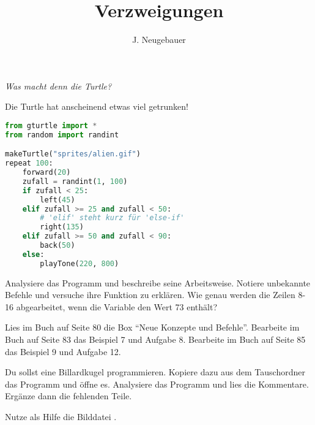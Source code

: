 \documentclass[10pt, a4paper]{scrartcl}
\author{J. Neugebauer}
\title{Verzweigungen}
\date{\Heute}
\begin{document}
\ReiheTitel

\begin{aufgabe}
	\emph{Was macht denn die Turtle?}
	
	Die Turtle hat anscheinend etwas viel getrunken! 
	
	\begin{lstlisting}[language=python]
from gturtle import *
from random import randint

makeTurtle("sprites/alien.gif")
repeat 100:
    forward(20)
    zufall = randint(1, 100)
    if zufall < 25:
        left(45)
    elif zufall >= 25 and zufall < 50:
        # 'elif' steht kurz für 'else-if'
        right(135)
    elif zufall >= 50 and zufall < 90:
        back(50)
    else:
        playTone(220, 800)
	\end{lstlisting}
	
	\begin{teilaufgaben}
		\teilaufgabe Analysiere das Programm und beschreibe seine Arbeitsweise. Notiere unbekannte Befehle und versuche ihre Funktion zu erklären.
		\teilaufgabe Wie genau werden die Zeilen 8-16 abgearbeitet, wenn die Variable  den Wert \num{73} enthält?
	\end{teilaufgaben}
\end{aufgabe}
	
	\begin{aufgabe}
		\begin{teilaufgaben}
			\teilaufgabe Lies im Buch auf Seite \num{80} die Box \enquote{Neue Konzepte und Befehle}.
			\teilaufgabe Bearbeite im Buch auf Seite 83 das Beispiel 7 und Aufgabe 8.
			\teilaufgabe Bearbeite im Buch auf Seite 85 das Beispiel 9 und Aufgabe 12.
		\end{teilaufgaben}
	\end{aufgabe}

	\begin{aufgabe}
		Du sollst eine Billardkugel programmieren. Kopiere dazu aus dem Tauschordner das Programm  und öffne es. Analysiere das Programm und lies die Kommentare. Ergänze dann die fehlenden Teile.
		
		Nutze als Hilfe die Bilddatei \datei{07-Abb\_Arbeitsfläche.png}. 
	\end{aufgabe}
	
\end{document}
